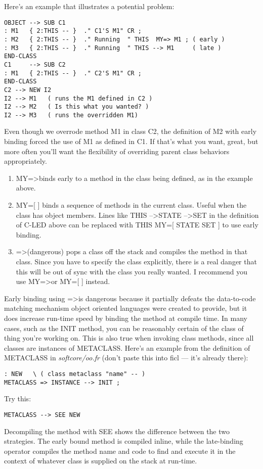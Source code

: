 \begin{;stlisting}[frame=single]
Here's an example that illustrates a potential problem:
\begin{lstlisting}[frame=single]
OBJECT --> SUB C1
: M1   { 2:THIS -- }  ." C1'S M1" CR ;
: M2   { 2:THIS -- }  ." Running  " THIS  MY=> M1 ; ( early )
: M3   { 2:THIS -- }  ." Running  " THIS --> M1     ( late )
END-CLASS
C1     --> SUB C2
: M1   { 2:THIS -- }  ." C2'S M1" CR ;
END-CLASS
C2 --> NEW I2
I2 --> M1   ( runs the M1 defined in C2 )
I2 --> M2   ( Is this what you wanted? )
I2 --> M3   ( runs the overridden M1)
\end{lstlisting}
Even though we overrode method M1 in class C2, the definition of M2
with early binding forced the use of M1 as defined in C1. If that's what
you want, great, but more often you'll want the flexibility of
overriding parent class behaviors appropriately.
\begin{enumerate}[noitemsep]
	\item MY=\textgreater  binds early to a method in the class
	being defined, as in the example above.

	\item MY=[ ] binds a sequence of methods in the current class.
	Useful when the class has object members. Lines like THIS
	--\textgreater  STATE --\textgreater  SET in the definition of
	C-LED above can be replaced with THIS MY=[ STATE SET ] to use
	early binding.

	\item =\textgreater  (dangerous) pops a class off the stack and
	compiles the method in that class. Since you have to specify the
	class explicitly, there is a real danger that this will be out
	of sync with the class you really wanted. I recommend you use
	MY=\textgreater or MY=[ ] instead.
\end{enumerate}
Early binding using =\textgreater  is dangerous because it partially
defeats the data-to-code matching mechanism object oriented languages
were created to provide, but it does increase run-time speed by binding
the method at compile time. In many cases, such as the INIT method, you
can be reasonably certain of the class of thing you're working on. This
is also true when invoking class methods, since all classes are
instances of METACLASS. Here's an example from the definition of
METACLASS in \textit{softcore/oo.fr} (don't paste this into ficl — it's
already there):
\begin{lstlisting}[frame=single]
: NEW   \ ( class metaclass "name" -- )
METACLASS => INSTANCE --> INIT ;
\end{lstlisting}
Try this:
\begin{lstlisting}
METACLASS --> SEE NEW
\end{lstlisting}
Decompiling the method with SEE shows the difference between the two
strategies. The early bound method is compiled inline, while the
late-binding operator compiles the method name and code to find and
execute it in the context of whatever class is supplied on the stack at
run-time.


\end{;stlisting}
